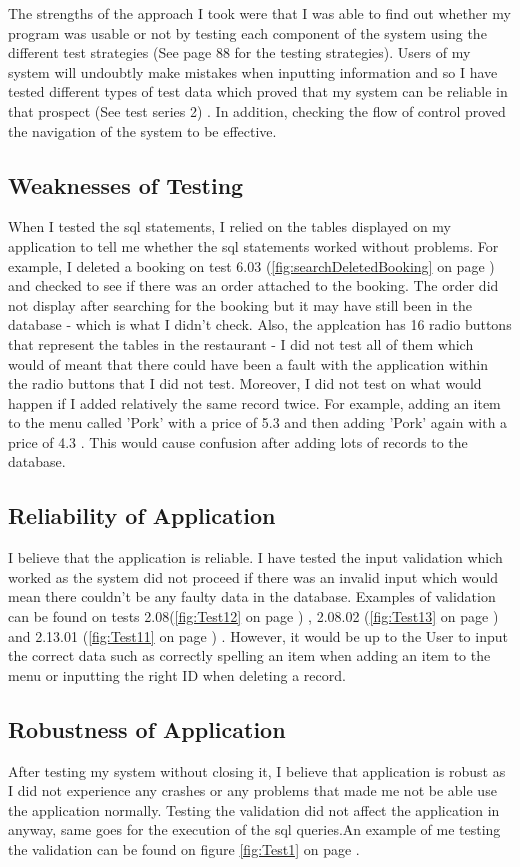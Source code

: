 The strengths of the approach I took were that I was able to find out whether my program was usable or not by testing each component of the system using the different test strategies (See page 88 for the testing strategies). Users of my system will undoubtly make mistakes when inputting information and so I have tested different types of test data which proved that my system can be reliable in that prospect (See test series 2) . In addition, checking the flow of control proved the navigation of the system to be effective.

\subsection{Weaknesses of Testing}

When I tested the sql statements, I relied on the tables displayed on my application to tell me whether the sql statements worked without problems. For example, I deleted a booking on test 6.03 (\ref{fig:searchDeletedBooking} on page \pageref{fig:searchDeletedBooking}) and checked to see if there was an order attached to the booking. The order did not display after searching for the booking but it may have still been in the database - which is what I didn't check. Also, the applcation has 16 radio buttons that represent the tables in the restaurant - I did not test all of them which would of meant that there could have been a fault with the application within the radio buttons that I did not test. Moreover, I did not test on what would happen if I added relatively the same record twice. For example, adding an item to the menu called 'Pork' with a price of 5.3 and then adding 'Pork' again with a price of 4.3 . This would cause confusion after adding lots of records to the database. 

\subsection{Reliability of Application}

I believe that the application is reliable. I have tested the input validation which worked as the system did not proceed if there was an invalid input which would mean there couldn't be any faulty data in the database. Examples of validation can be found on tests 2.08(\ref{fig:Test12} on page \pageref{fig:Test12}) , 2.08.02 (\ref{fig:Test13} on page \pageref{fig:Test13}) and 2.13.01 (\ref{fig:Test11} on page \pageref{fig:Test11}) . However, it would be up to the User to input the correct data such as correctly spelling an item when adding an item to the menu or inputting the right ID when deleting a record.


\subsection{Robustness of Application}
After testing my system without closing it, I believe that application is robust as I did not experience any crashes or any problems that made me not be able use the application normally. Testing the validation did not affect the application in anyway, same goes for the execution of the sql queries.An example of me testing the validation can be found on figure \ref{fig:Test1} on page \pageref{fig:Test12}.